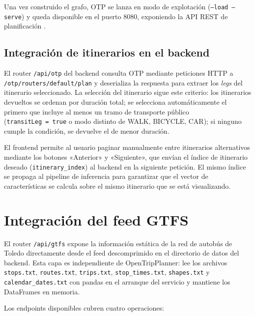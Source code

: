 Una vez construido el grafo, OTP se lanza en modo de explotación (\texttt{--load --serve}) y queda disponible en el puerto 8080, exponiendo la API REST de planificación \cite{OTPRouteRequest}.

\subsection{Integración de itinerarios en el backend}

El router \texttt{/api/otp} del backend consulta OTP mediante peticiones HTTP a \texttt{/otp/routers/default/plan} y deserializa la respuesta para extraer los \textit{legs} del itinerario seleccionado. La selección del itinerario sigue este criterio: los itinerarios devueltos se ordenan por duración total; se selecciona automáticamente el primero que incluye al menos un tramo de transporte público (\texttt{transitLeg~=~true} o modo distinto de WALK, BICYCLE, CAR); si ninguno cumple la condición, se devuelve el de menor duración.

El frontend permite al usuario paginar manualmente entre itinerarios alternativos mediante los botones «Anterior» y «Siguiente», que envían el índice de itinerario deseado (\texttt{itinerary\_index}) al backend en la siguiente petición. El mismo índice se propaga al pipeline de inferencia para garantizar que el vector de características se calcula sobre el mismo itinerario que se está visualizando.

\section{Integración del feed GTFS}
\label{sec:impl_gtfs}

El router \texttt{/api/gtfs} expone la información estática de la red de autobús de Toledo directamente desde el feed descomprimido en el directorio de datos del backend. Esta capa es independiente de OpenTripPlanner: lee los archivos \texttt{stops.txt}, \texttt{routes.txt}, \texttt{trips.txt}, \texttt{stop\_times.txt}, \texttt{shapes.txt} y \texttt{calendar\_dates.txt} con pandas en el arranque del servicio y mantiene los DataFrames en memoria.

Los endpoints disponibles cubren cuatro operaciones:

